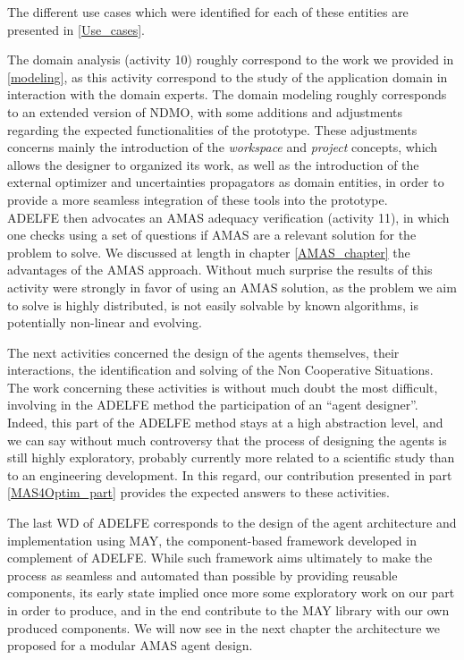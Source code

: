 The different use cases which were identified for each of these entities are presented in \figurename{} \ref{Use_cases}.

The domain analysis (activity 10) roughly correspond to the work we provided in \ref{modeling}, as this activity correspond to the study of the application domain in interaction with the domain experts. The domain modeling roughly corresponds to an extended version of NDMO, with some additions and adjustments regarding the expected functionalities of the prototype. These adjustments concerns mainly the introduction of the \emph{workspace} and \emph{project} concepts, which allows the designer to organized its work, as well as the introduction of the external optimizer and uncertainties propagators as domain entities, in order to provide a more seamless integration of these tools into the prototype.\\
ADELFE then advocates an AMAS adequacy verification (activity 11), in which one checks using a set of questions if AMAS are a relevant solution for the problem to solve. We discussed at length in chapter \ref{AMAS_chapter} the advantages of the AMAS approach. Without much surprise the results of this activity were strongly in favor of using an AMAS solution, as the problem we aim to solve  is highly distributed, is not easily solvable by known algorithms, is potentially non-linear and evolving.

The next activities concerned the design of the agents themselves, their interactions, the identification and solving of the Non Cooperative Situations. The work concerning these activities is without much doubt the most difficult, involving in the ADELFE method the participation of an \enquote{agent designer}. Indeed, this part of the ADELFE method stays at a high abstraction level, and we can say without much controversy that the process of designing the agents is still highly exploratory, probably currently more related to a scientific study than to an engineering development. In this regard, our contribution presented in part \ref{MAS4Optim_part} provides the expected answers to these activities.

The last WD of ADELFE corresponds to the design of the agent architecture and implementation using MAY, the component-based framework developed in complement of ADELFE. While such framework aims ultimately to make the process as seamless and  automated than possible by providing reusable components, its early state implied once more some exploratory work on our part in order to produce, and in the end contribute to the MAY library with our own produced components. We will now see in the next chapter the architecture we proposed for a modular AMAS agent design.

